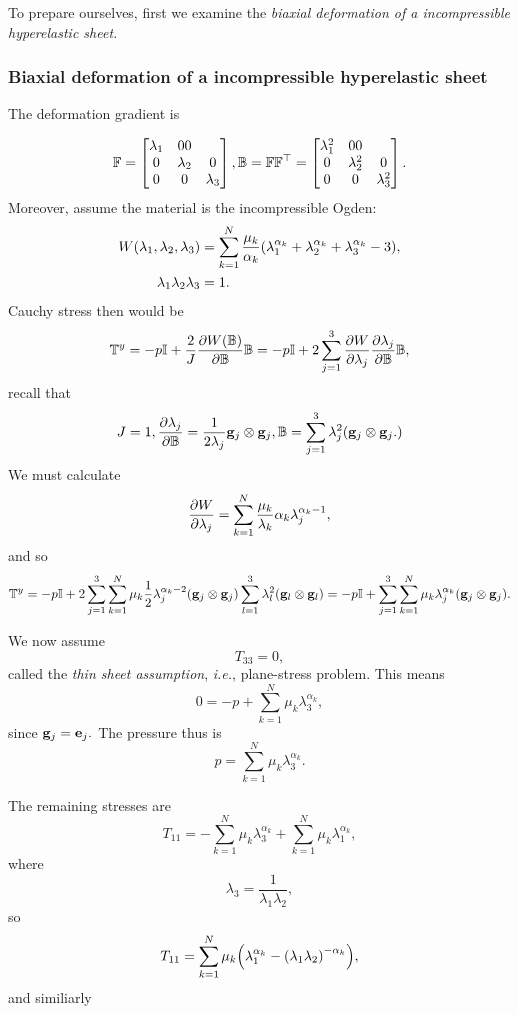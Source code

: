 \documentclass[11pt]{scrartcl} %
\begin{document}
To prepare ourselves, first we examine the \textit{biaxial deformation of a incompressible hyperelastic sheet.}

\subsubsection{Biaxial deformation of a incompressible hyperelastic sheet}
\label{sec:biaxial}
The deformation gradient is

\[
	\mathbb{F} = \begin{bmatrix}
		\lambda_1 & 0 0 \\
		0 & \lambda_2 & 0 \\
		0 & 0 & \lambda_3
	\end{bmatrix},
	\mathbb{B} = \mathbb{F} \mathbb{F}^\top = \begin{bmatrix}
		\lambda_1^{2} & 0 0 \\
		0 & \lambda_2^{2} & 0 \\
		0 & 0 & \lambda_3^{2}
	\end{bmatrix}.
\]
Moreover, assume the material is the incompressible Ogden:
\begin{align*}
	W\qty(\lambda_1, \lambda_2, \lambda_3) &= \sum_{k=1}^N \frac{\mu_k}{\alpha_k}\qty(\lambda_1^{\alpha_k} + \lambda_2^{\alpha_k} + \lambda_3^{\alpha_k}-3), \\
	\lambda_1 \lambda_2 \lambda_3 &= 1.
\end{align*}
Cauchy stress then would be
\[
	\mathbb{T}^y = - p \mathbb{I} + \frac{2}{J} \pdv{W\qty(\ensuremath{\mathbb{B}})}{\ensuremath{\mathbb{B}}}\mathbb{B} = -p \mathbb{I} + 2 \sum_{j=1}^3 \pdv{W}{\lambda_j}\pdv{\lambda_j}{\ensuremath{\mathbb{B}}}\mathbb{B},
\]
recall that
\[
	J = 1, \pdv{\lambda_j}{\ensuremath{\mathbb{B}}} = \frac{1}{2 \lambda_j}\vb{g}_j \otimes \vb{g}_j, \mathbb{B} = \sum_{j = 1}^3 \lambda_j^{2}\qty(\vb{g}_j \otimes \vb{g}_j.)
\]
We must calculate
\[
	\pdv{W}{\lambda_j} = \sum_{k=1}^N \frac{\mu_k}{\lambda_k} \alpha_k \lambda_j^{\alpha_k - 1},
\]
and so 
\[
	\mathbb{T}^y = - p \mathbb{I} + 2 \sum_{j=1}^3 \sum_{k=1}^N \mu_k \frac{1}{2} \lambda_j^{\alpha_k - 2} \qty(\vb{g}_j \otimes \vb{g}_j)\sum_{l=1}^3 \lambda_l^{2}\qty(\vb{g}_l \otimes \vb{g}_l) = - p \mathbb{I} + \sum_{j=1}^3 \sum_{k=1}^N \mu_k \lambda_j^{\alpha_k}\qty(\vb{g}_j \otimes \vb{g}_j).
\]

We now assume
\[
	T_{33} = 0,
\]
called the \textit{thin sheet assumption}, \textit{i.e.}, plane-stress problem. This means
\[
	0 = - p + \sum_{k=1}^N \mu_k \lambda_3^{\alpha_k},
\]
since $\vb{g}_j =  \vb{e}_j.$ The pressure thus is
\[
	p = \sum_{k=1}^N \mu_k \lambda_3^{\alpha_k}.
\]

The remaining stresses are
\[
	T_{11} = - \sum_{k=1}^N \mu_k \lambda_3^{\alpha_k} + \sum_{k=1}^N \mu_k \lambda^{\alpha_k}_1,
\]
where
\[
	\lambda_3 = \frac{1}{\lambda_1 \lambda_2},
\]
so
\[
	T_{11} = \sum_{k=1}^N \mu_k \qty(\lambda_1^{\alpha_k} - \qty(\lambda_1 \lambda_2)^{-\alpha_k}),
\]
and similiarly
\end{document}
